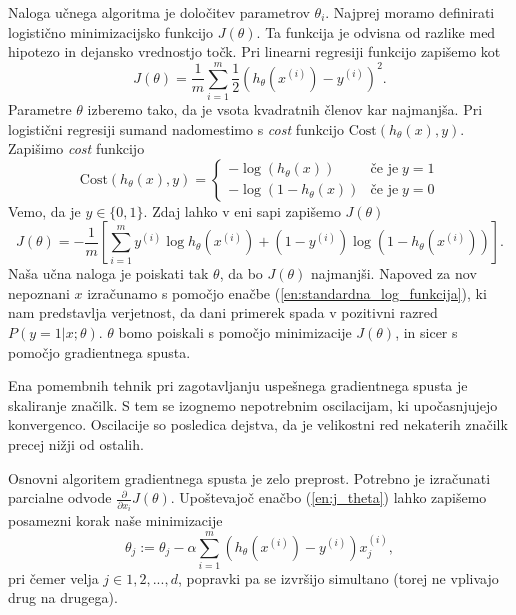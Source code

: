 \documentclass[11pt,a4paper,openany]{book}
\begin{document}
Naloga učnega algoritma je določitev parametrov $\theta_i$. Najprej moramo definirati logistično minimizacijsko funkcijo $J(\theta)$. Ta funkcija je odvisna od razlike med hipotezo in dejansko vrednostjo točk. Pri linearni regresiji funkcijo zapišemo kot
\begin{equation}
	J(\theta) = \frac{1}{m} \sum^m_{i = 1} \frac{1}{2} \left( h_\theta(x^{(i)}) - y^{(i)}\right)^2.
\end{equation}
Parametre $\theta$ izberemo tako, da je vsota kvadratnih členov kar najmanjša. Pri logistični regresiji sumand nadomestimo s \textit{cost} funkcijo $\text{Cost}(h_\theta(x), y)$. Zapišimo \textit{cost} funkcijo
\begin{equation}
	\text{Cost}(h_\theta(x), y) = \left\{
	\begin{array}{rl}
		-\log(h_\theta(x)) & \text{če je} \; y = 1 \\
		-\log(1 - h_\theta(x)) & \text{če je} \; y = 0
	\end{array}
	\right.
\end{equation}
Vemo, da je $y \in \{0, 1\}$. Zdaj lahko v eni sapi zapišemo $J(\theta)$
\begin{equation}
	J(\theta) = -\frac{1}{m} \left[ 
		\sum^m_{i = 1}
			y^{(i)} \log h_\theta(x^{(i)}) + (1 - y^{(i)}) \log (1 - h_\theta(x^{(i)}))
	\right].
	\label{en:j_theta}
\end{equation}
Naša učna naloga je poiskati tak $\theta$, da bo $J(\theta)$ najmanjši. Napoved za nov nepoznani $x$ izračunamo s pomočjo enačbe (\ref{en:standardna_log_funkcija}), ki nam predstavlja verjetnost, da dani primerek spada v pozitivni razred $P(y = 1 | x;\theta)$. $\theta$ bomo poiskali s pomočjo minimizacije $J(\theta)$, in sicer s pomočjo gradientnega spusta.

Ena pomembnih tehnik pri zagotavljanju uspešnega gradientnega spusta je skaliranje značilk. S tem se izognemo nepotrebnim oscilacijam, ki upočasnjujejo konvergenco. Oscilacije so posledica dejstva, da je velikostni red nekaterih značilk precej nižji od ostalih.

Osnovni algoritem gradientnega spusta je zelo preprost. Potrebno je izračunati parcialne odvode $\frac{\partial}{\partial x_i}J(\theta)$. Upoštevajoč enačbo (\ref{en:j_theta}) lahko zapišemo posamezni korak naše minimizacije
\begin{equation}
	\theta_j := \theta_j - \alpha \sum^m_{i = 1}(h_\theta(x^{(i)}) - y^{(i)})x_j^{(i)},
	\label{en:log_reg_update}
\end{equation}  
pri čemer velja $j \in {1, 2, ...,  d}$, popravki pa se izvršijo simultano (torej ne vplivajo drug na drugega).
\end{document}
